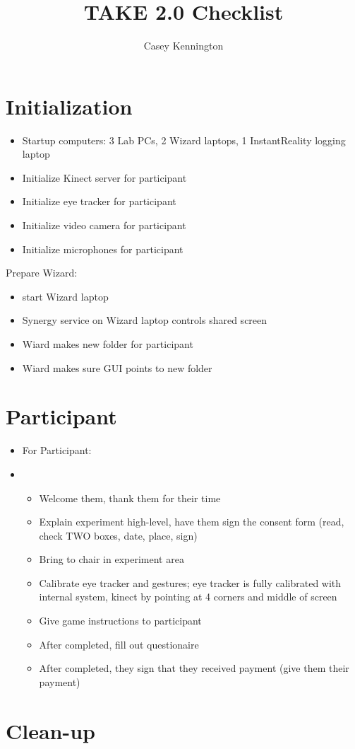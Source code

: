\documentclass[11pt]{article}
\title{TAKE 2.0 Checklist}
\author{Casey Kennington}
\begin{document}
\maketitle

\section{Initialization}
\begin{itemize}
 \item Startup computers: 3 Lab PCs, 2 Wizard laptops, 1 InstantReality logging laptop
 \item Initialize Kinect server for participant
 \item Initialize eye tracker for participant
 \item Initialize video camera for participant
 \item Initialize microphones for participant
\end{itemize}

Prepare Wizard:
\begin{itemize}
 \item start Wizard laptop
 \item Synergy service on Wizard laptop controls shared screen
 \item Wiard makes new folder for participant
 \item Wiard makes sure GUI points to new folder
\end{itemize}

\section{Participant}
\begin{itemize}
 \item For Participant:
 \item \begin{itemize}
        \item Welcome them, thank them for their time
        \item Explain experiment high-level, have them sign the consent form (read, check TWO boxes, date, place, sign)
        \item Bring to chair in experiment area
        \item Calibrate eye tracker and gestures; eye tracker is fully calibrated with internal system, kinect by pointing at 4 corners and middle of screen
        \item Give game instructions to participant
        \item After completed, fill out questionaire
        \item After completed, they sign that they received payment (give them their payment)
       \end{itemize}
\end{itemize}



\section{Clean-up}
\end{document}
